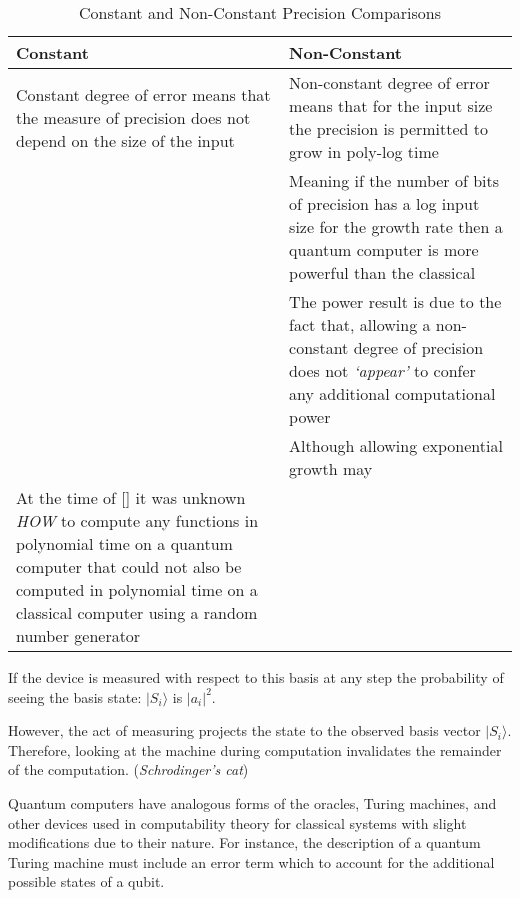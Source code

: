 \begin{table}
\begin{center}
\begin{tabularx}{400pt}{|X|X|} \hline
\textbf{Constant} & \textbf{Non-Constant} \\ \hline
Constant degree of error means that the measure of precision does not depend on the size of the input & Non-constant degree of error means that for the input size the precision is permitted to grow in poly-log time \\ \hline
 & Meaning if the number of bits of precision has a log input size for the growth rate then a quantum computer is more powerful than the classical \\ \hline
 & The power result is due to the fact that, allowing a non-constant degree of precision does not \emph{`appear'} to confer any additional computational power \\ \hline
 & Although allowing exponential growth may \\ \hline
At the time of [\cite{Sho1997}] it was unknown \emph{HOW} to compute any functions in polynomial time on a quantum computer that could not also be computed in polynomial time on a classical computer using a random number generator &  \\ \hline
\end{tabularx}
\caption{Constant and Non-Constant Precision Comparisons}
\label{tbl:constnon}
\end{center}
\end{table}



\begin{prot}
    If the device is measured with respect to this basis at any step the probability of seeing the basis state: $| S_{i} \rangle$ is $|a_{i}|^{2}$.    
\end{prot}


\begin{rem}
    However, the act of measuring projects the state to the observed basis vector $|S_{i} \rangle$. Therefore, looking at the machine during computation invalidates the remainder of the computation.
    (\emph{Schrodinger's cat})    
\end{rem}



Quantum computers have analogous forms of the oracles, Turing machines, and other devices used in computability theory for classical systems with slight modifications due to their nature. For instance, the description of a quantum Turing machine must include an error term which to account for the additional possible states of a qubit.


